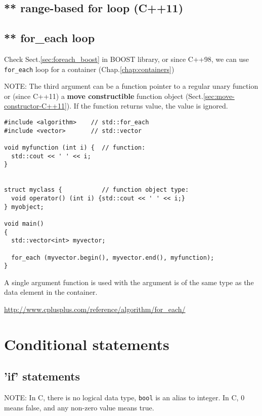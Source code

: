\subsection{** range-based for loop (C++11)}
\label{sec:loop_range-based-for-loop}
\label{sec:for-loop-ranged-based}



\subsection{** for\_each loop}
\label{sec:loop_for_each}

Check Sect.\ref{sec:foreach_boost} in BOOST library, or since C++98, we can use 
\verb!for_each! loop for a container (Chap.\ref{chap:containers})

NOTE: The third argument can be a function pointer to a regular unary function
or (since C++11) a {\bf move constructible} function object
(Sect.\ref{sec:move-constructor-C++11}). If the function returns value, the
value is ignored.

\begin{lstlisting}
#include <algorithm>    // std::for_each
#include <vector>       // std::vector

void myfunction (int i) {  // function:
  std::cout << ' ' << i;
}


struct myclass {           // function object type:
  void operator() (int i) {std::cout << ' ' << i;}
} myobject;

void main()
{
  std::vector<int> myvector;
  
  for_each (myvector.begin(), myvector.end(), myfunction);
}

\end{lstlisting}
A single argument function is used with the argument is of the same type as the
data element in the container.

\url{http://www.cplusplus.com/reference/algorithm/for_each/}



\section{Conditional statements}

\subsection{'if' statements}

NOTE: In C, there is no logical data type, \verb!bool! is an alias to integer.
In C, 0 means false, and any non-zero value means true.

